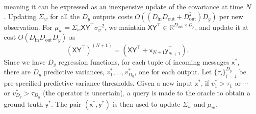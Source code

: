 \documentclass[english]{article}
\theoremstyle{plain}
\theoremstyle{plain}
\newcommand{\feax}{\mathsf{x}}
\newcommand{\feaX}{\mathsf{X}}
\newcommand{\feay}{\mathsf{y}}
\newcommand{\feaY}{\mathsf{Y}}
\newcommand{\wjnote}[1]{ }
\begin{document}
meaning it can be expressed
as an inexpensive update of
the covariance at time $N$.
Updating $\Sigma_{w}$ for all the $D_y$ outputs costs 
$O( (D_\mathrm{in}D_\mathrm{out} + D_\mathrm{out}^{2}) D_y)$ 
per new observation. 
For $\mu_{w}= \Sigma_{w} \mathsf{X} \mathsf{Y}^{\top}\sigma_{y}^{-2}$, we maintain
$ \mathsf{X} \mathsf{Y}^{\top}\in\mathbb{R}^{D_{\mathrm{out}}\times D_{\mathrm{y}}}$, and update it
at cost $O(D_\mathrm{in}D_\mathrm{out}D_y)$ as
\begin{equation}
\left( \feaX \feaY^{\top}\right)^{(N+1)}=\left( \feaX \feaY^{\top}+ \feax_{N+1} \feay^\top_{N+1}\right).
\end{equation}
%
%
Since we have $D_{y}$ regression functions, 
for each tuple of incoming messages $\feax^{*}$, there are $D_{y}$
predictive variances, $v_{1}^{*},\ldots,v_{D_{y}}^{*}$, one for each
output. 
Let $\{\tau_{i}\}_{i=1}^{D_{y}}$ be pre-specified predictive variance thresholds.
Given a new input $\feax^{*}$, if $v_{1}^{*}>\tau_{1}$ or $\cdots$
or $v_{D_{y}}^{*}>\tau_{D_{y}}$ (the operator is uncertain), 
a query is made to the oracle to obtain a ground truth $\feay^{*}$. 
The pair $(\feax^{*}, \feay^{*})$ is then
used to update $\Sigma_{w}$ and $\mu_{w}$.%

\end{document}
